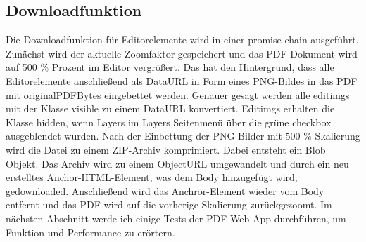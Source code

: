 \subsection{Downloadfunktion}
Die Downloadfunktion für Editorelemente wird in einer promise chain ausgeführt. Zunächst wird der aktuelle Zoomfaktor gespeichert und das PDF-Dokument wird auf 500 \% Prozent im Editor vergrößert. Das hat den Hintergrund, dass alle Editorelemente anschließend als DataURL in Form eines PNG-Bildes in das PDF mit originalPDFBytes eingebettet werden. Genauer gesagt werden alle editimgs mit der Klasse visible zu einem DataURL konvertiert. Editimgs erhalten die Klasse hidden, wenn Layers im Layers Seitenmenü über die grüne checkbox ausgeblendet wurden. Nach der Einbettung der PNG-Bilder mit 500 \% Skalierung wird die Datei zu einem ZIP-Archiv komprimiert. Dabei entsteht ein Blob Objekt. Das Archiv wird zu einem ObjectURL umgewandelt und durch ein neu erstelltes Anchor-HTML-Element, was dem Body hinzugefügt wird, gedownloaded. Anschließend wird das Anchror-Element wieder vom Body entfernt und das PDF wird auf die vorherige Skalierung zurückgezoomt. Im nächsten Abschnitt werde ich einige Tests der PDF Web App durchführen, um Funktion und Performance zu erörtern. 